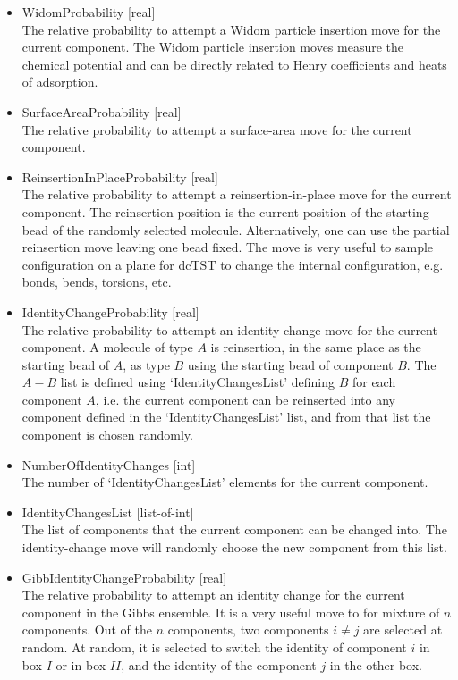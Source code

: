 \begin{itemize}
\item{WidomProbability [real]}\\
The relative probability to attempt a Widom particle insertion move for the current component. The Widom particle insertion moves measure the chemical potential
and can be directly related to Henry coefficients and heats of adsorption.
\item{SurfaceAreaProbability [real]}\\
The relative probability to attempt a surface-area move for the current component.
\item{ReinsertionInPlaceProbability [real]}\\
The relative probability to attempt a reinsertion-in-place move for the current component. The reinsertion position is the current position of the starting bead of the randomly selected
molecule. Alternatively, one can use the partial reinsertion move leaving one bead fixed. The move is very useful to sample configuration on a plane for dcTST to change
the internal configuration, e.g. bonds, bends, torsions, etc.
\item{IdentityChangeProbability [real]}\\
The relative probability to attempt an identity-change move for the current component. A molecule of type $A$ is reinsertion, in the same place as the starting bead of $A$, as type $B$ using
the starting bead of component $B$. The $A-B$ list is defined using `IdentityChangesList' defining $B$ for each component $A$, i.e. the current component can be reinserted into
any component defined in the `IdentityChangesList' list, and from that list the component is chosen randomly.
\item{NumberOfIdentityChanges [int]}\\
The number of `IdentityChangesList' elements for the current component.
\item{IdentityChangesList [list-of-int]}\\
The list of components that the current component can be changed into. The identity-change move will randomly choose the new component from this list.
\item{GibbIdentityChangeProbability [real]}\\
The relative probability to attempt an identity change for the current component in the Gibbs ensemble.
It is a very useful move to for mixture of $n$ components. Out of the $n$ components, two components $i\not=j$ are selected at random.
At random, it is selected to switch the identity of component $i$
in box $I$ or in box $II$, and the identity of the component $j$ in the other box.

\end{itemize}
